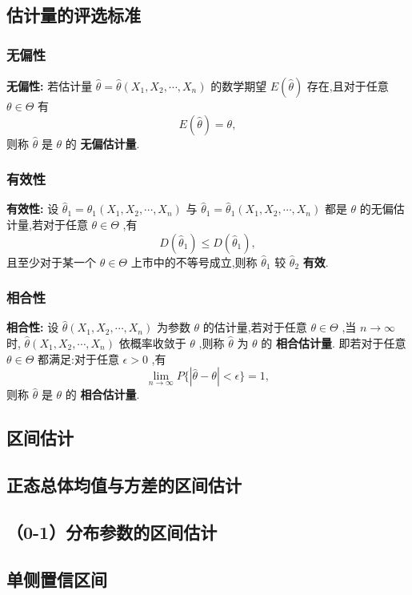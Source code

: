 \documentclass[UTF8,10pt]{ctexart}
\begin{document}
	\subsection{估计量的评选标准}
	
	\subsubsection{无偏性}
	
	\textbf{无偏性:} 若估计量 $ \hat{ \theta } = \hat{ \theta } (X_{1},X_{2}, \cdots ,X_{n}) $ 的数学期望 $ E( \hat{ \theta } ) $ 存在,且对于任意 $ \theta \in \Theta $ 有 $$ E( \hat{ \theta } )= \theta , $$ 则称 $ \hat{ \theta } $ 是 $ \theta $ 的 \textbf{无偏估计量}.
	
	\subsubsection{有效性}
	
	\textbf{有效性:} 设 $ \hat{ \theta } _{1} = \hat{ \theta} _{1} (X_{1},X_{2}, \cdots ,X_{n}) $ 与 $ \hat{ \theta } _{1} = \hat{ \theta } _{1} (X_{1},X_{2}, \cdots ,X_{n}) $ 都是 $ \theta $ 的无偏估计量,若对于任意 $ \theta \in \Theta $ ,有 $$ D( \hat{ \theta } _{1} ) \le D( \hat{ \theta } _{1} ), $$ 且至少对于某一个 $ \theta \in \Theta $ 上市中的不等号成立,则称 $ \hat{ \theta } _{1} $ 较 $ \hat{ \theta } _{2} $ \textbf{有效}.
	
	\subsubsection{相合性}
	
	\textbf{相合性:} 设 $ \hat{ \theta } (X_{1},X_{2}, \cdots ,X_{n}) $ 为参数 $ \theta $ 的估计量,若对于任意 $ \theta \in \Theta $ ,当 $ n \to \infty $ 时, $ \hat{ \theta } (X_{1},X_{2}, \cdots ,X_{n}) $ 依概率收敛于 $ \theta $ ,则称 $ \hat{ \theta } $ 为 $ \theta $ 的 \textbf{相合估计量}. 即若对于任意 $ \theta \in \Theta $ 都满足:对于任意 $ \epsilon >0 $ ,有 $$ \lim\limits_{n \to \infty }P\{| \hat{ \theta } - \theta |< \epsilon \}=1, $$ 则称 $ \hat{ \theta } $ 是 $ \theta $ 的 \textbf{相合估计量}.
	
	\subsection{区间估计}
	
	\subsection{正态总体均值与方差的区间估计}
	
	\subsection{（0-1）分布参数的区间估计}
	
	\subsection{单侧置信区间}
	
\end{document}
